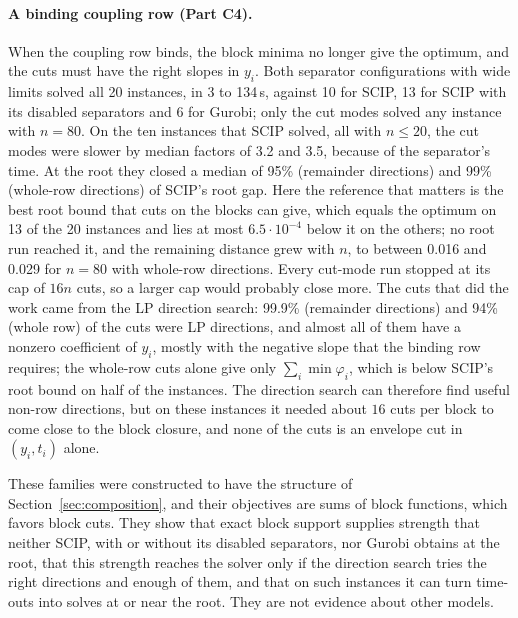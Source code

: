 \paragraph{A binding coupling row (Part C4).} When the coupling row binds,
the block minima no longer give the optimum, and the cuts must have the right
slopes in $y_i$. Both separator configurations with wide limits solved all 20
instances, in 3 to 134\,s, against 10 for SCIP, 13 for SCIP with its disabled
separators and 6 for Gurobi; only the cut modes solved any instance with
$n=80$. On the ten instances that SCIP solved, all with $n\le20$, the cut
modes were slower by median factors of 3.2 and 3.5, because of the
separator's time. At the root they closed a median of 95\% (remainder directions) and 99\%
(whole-row directions) of SCIP's root gap. Here the reference that matters is
the best root bound that cuts on the blocks can give, which equals the optimum
on 13 of the 20 instances and lies at most $6.5\cdot10^{-4}$ below it on the
others; no root run reached it, and the remaining distance grew with $n$, to
between 0.016 and 0.029 for $n=80$ with whole-row directions. Every cut-mode run
stopped at its cap of $16n$ cuts, so a larger cap would probably close more. The
cuts that did the work came from the LP direction search: 99.9\% (remainder directions) and
94\% (whole row) of the cuts were LP directions, and almost all of them have a
nonzero coefficient of $y_i$, mostly with the negative slope that the binding
row requires; the whole-row cuts alone give only $\sum_i\min\varphi_i$, which is
below SCIP's root bound on half of the instances. The direction search can
therefore find useful non-row directions, but on these instances it needed
about $16$ cuts per block to come close to the block closure, and none of the
cuts is an envelope cut in $(y_i,t_i)$ alone.

These families were constructed to have the structure of
Section~\ref{sec:composition}, and their objectives are sums of block
functions, which favors block cuts. They show that exact block support
supplies strength that neither SCIP, with or without its disabled separators,
nor Gurobi obtains at the root, that this strength reaches the solver only if
the direction search tries the right directions and enough of them, and that
on such instances it can turn time-outs into solves at or near the root. They
are not evidence about other models.
